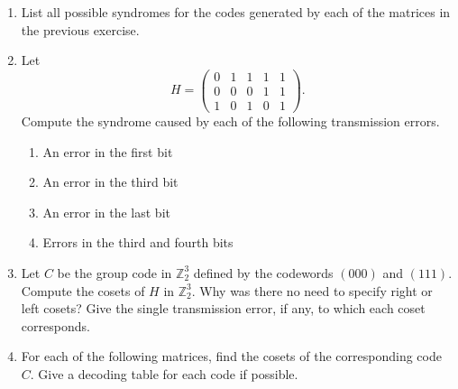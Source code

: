 {\begin{enumerate}
\begin{minipage}[t]{4.6in}
\begin{minipage}[t]{2.25in}
\begin{itemize}
 \item[{\bf (d)}]
 
\end{itemize}
\end{minipage}
\end{minipage}
 
\vspace{4pt}        %
 
 
\item %
List all possible syndromes for the codes generated by each of the
matrices in the previous exercise. 
 
 
\item
Let
\[
H =
\left(
\begin{array}{ccccc}
0 & 1 & 1 & 1 & 1 \\
0 & 0 & 0 & 1 & 1 \\
1 & 0 & 1 & 0 & 1
\end{array}
\right).
\]
Compute the syndrome caused by each of the following transmission
errors. 
\begin{enumerate}
 
 \item 
An error in the first bit
 
 \item 
An error in the third bit
 
 \item 
An error in the last bit
 
 \item 
Errors in the third and fourth bits
 
\end{enumerate}
 
 
\item
Let $C$ be the group code in ${\mathbb Z}_2^3$ defined by the codewords
$(000)$ and $(111)$. Compute the cosets of $H$ in ${\mathbb Z}_2^3$. Why
was there no need to specify right or left cosets? Give the
single transmission error, if any, to which each coset corresponds.
 
 
\item
For each of the following matrices, find the cosets of the
corresponding code $C$. Give a decoding table for each code if
possible. 
 

\end{enumerate}}
